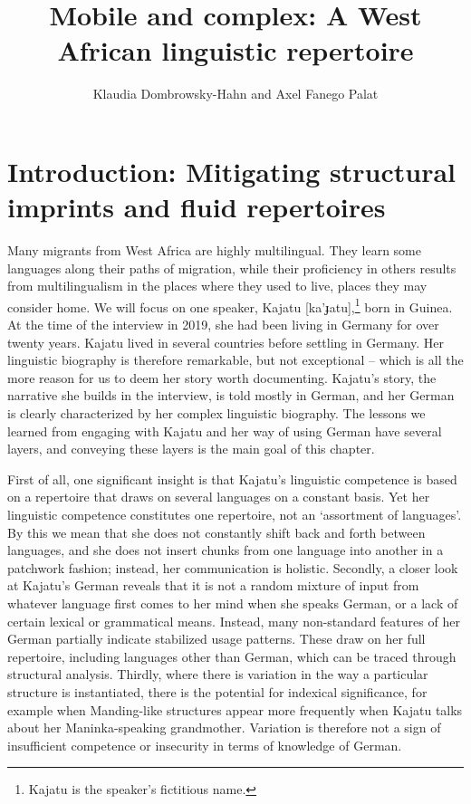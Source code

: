 \documentclass[output=paper]{langscibook}
\author{Klaudia Dombrowsky-Hahn\orcid{ 0000-0003-0600-2018}\affiliation{University of Bayreuth} and Axel Fanego Palat\orcid{ 0000-0003-3284-9562}\affiliation{Goethe University Frankfurt}}
\title{Mobile and complex: A West African linguistic repertoire}
\begin{document}
\maketitle

\section{Introduction: Mitigating structural imprints and fluid repertoires}\label{fanego:sec:1}

Many migrants from West Africa are highly multilingual. They learn some languages along their paths of migration, while their proficiency in others results from multilingualism in the places where they used to live, places they may consider home. We will focus on one speaker, Kajatu [ka'ɟatu],\footnote{Kajatu is the speaker’s fictitious name.} born in Guinea. At the time of the interview in 2019, she had been living in Germany for over twenty years. Kajatu lived in several countries before settling in Germany. Her linguistic biography is therefore remarkable, but not exceptional – which is all the more reason for us to deem her story worth documenting. Kajatu’s story, the narrative she builds in the interview, is told mostly in German, and her German is clearly characterized by her complex linguistic biography. The lessons we learned from engaging with Kajatu and her way of using German have several layers, and conveying these layers is the main goal of this chapter. 

First of all, one significant insight is that Kajatu’s linguistic competence is based on a repertoire that draws on several languages on a constant basis. Yet her linguistic competence constitutes one repertoire, not an ‘assortment of languages’. By this we mean that she does not constantly shift back and forth between languages, and she does not insert chunks from one language into another in a patchwork fashion; instead, her communication is holistic. Secondly, a closer look at Kajatu’s German reveals that it is not a random mixture of input from whatever language first comes to her mind when she speaks German, or a lack of certain lexical or grammatical means. Instead, many non-standard features of her German partially indicate stabilized usage patterns. These draw on her full repertoire, including languages other than German, which can be traced through structural analysis. Thirdly, where there is variation in the way a particular structure is instantiated, there is the potential for indexical significance, for example when Manding-like structures appear more frequently when Kajatu talks about her Maninka-speaking grandmother. Variation is therefore not a sign of insufficient competence or insecurity in terms of knowledge of German.  
\end{document}
